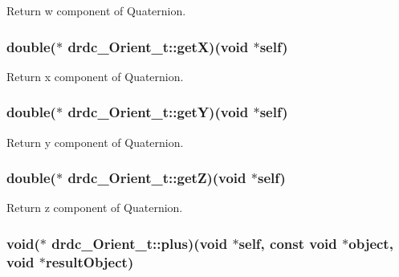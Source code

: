 Return w component of Quaternion. 

\hypertarget{structdrdc__Orient__t_735b8ebd199a1e71872e08b96f613e5f}{
\subsubsection[getX]{\setlength{\rightskip}{0pt plus 5cm}double($\ast$ {\bf drdc\_\-Orient\_\-t::getX})(void $\ast$self)}}
\label{structdrdc__Orient__t_735b8ebd199a1e71872e08b96f613e5f}


Return x component of Quaternion. 

\hypertarget{structdrdc__Orient__t_2a605d16af23ba39281358b780feb4f7}{
\subsubsection[getY]{\setlength{\rightskip}{0pt plus 5cm}double($\ast$ {\bf drdc\_\-Orient\_\-t::getY})(void $\ast$self)}}
\label{structdrdc__Orient__t_2a605d16af23ba39281358b780feb4f7}


Return y component of Quaternion. 

\hypertarget{structdrdc__Orient__t_4cb25960d5d86860b503b3142fce5759}{
\subsubsection[getZ]{\setlength{\rightskip}{0pt plus 5cm}double($\ast$ {\bf drdc\_\-Orient\_\-t::getZ})(void $\ast$self)}}
\label{structdrdc__Orient__t_4cb25960d5d86860b503b3142fce5759}


Return z component of Quaternion. 

\hypertarget{structdrdc__Orient__t_87eca4fac4d681f036865d3197b38967}{
\subsubsection[plus]{\setlength{\rightskip}{0pt plus 5cm}void($\ast$ {\bf drdc\_\-Orient\_\-t::plus})(void $\ast$self, const void $\ast$object, void $\ast$resultObject)}}
\label{structdrdc__Orient__t_87eca4fac4d681f036865d3197b38967}


